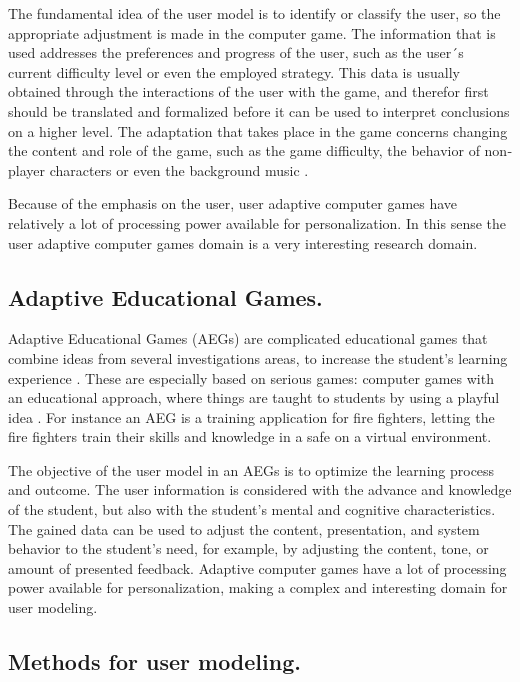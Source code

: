 The fundamental idea of the user model is to identify or classify the user, so
the appropriate adjustment is made in the computer game. The information that is
used addresses the preferences and progress of the user, such as the user´s
current  difficulty level or even the employed strategy. This data is usually
obtained through the interactions of  the user with the game, and therefor first
should be translated and formalized  before it can be  used to interpret
conclusions on a higher level. The adaptation that takes place in the game
concerns changing the content and role of the  game, such as the game
difficulty, the behavior of non‐player characters  or even the background  music
\cite{bakkes2012personalised}.

Because of the emphasis on the user, user adaptive computer games have
relatively a lot of processing power available  for personalization. In this
sense the user adaptive computer games domain is a very interesting research
domain.

\subsection{Adaptive Educational Games.}

Adaptive Educational Games (AEGs) are complicated educational games that combine
ideas from several investigations areas, to increase the student’s learning
experience \cite{peeters2012situated}. These are especially based on  serious
games: computer games with an educational approach, where things are taught to
students by using a  playful idea \cite{korteling2011transfer} \cite{johnson2005serious}.
For instance an AEG is a training application  for fire fighters, letting
the fire fighters train their skills and knowledge in a safe on a virtual
environment.

The objective of the user model in an AEGs is to optimize the learning process
and outcome.   The user information is considered with the advance and knowledge
of the student, but also with the  student’s mental and cognitive
characteristics. The gained data can be used to adjust the content,
presentation, and system behavior to the  student’s need, for example, by
adjusting the content, tone, or amount of presented feedback. Adaptive computer
games have a lot of processing power available for personalization,  making a
complex and interesting domain for user modeling.

\subsection{Methods for user modeling.}

